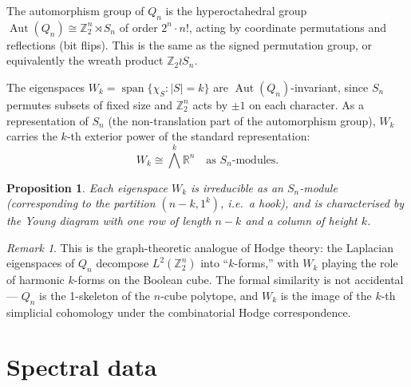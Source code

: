 \documentclass[11pt,a4paper]{article}
\theoremstyle{plain}
\newtheorem{proposition}[theorem]{Proposition}
\theoremstyle{definition}
\theoremstyle{remark}
\newtheorem{remark}[theorem]{Remark}
\newcommand{\Z}{\mathbb{Z}}
\newcommand{\R}{\mathbb{R}}
\newcommand{\Aut}{\operatorname{Aut}}
\begin{document}
The automorphism group of $Q_n$ is the hyperoctahedral group
$\Aut(Q_n) \cong \Z_2^n \rtimes S_n$ of order $2^n \cdot n!$, acting by
coordinate permutations and reflections (bit flips). This is the same as the
signed permutation group, or equivalently the wreath product $\Z_2 \wr S_n$.

The eigenspaces $W_k = \operatorname{span}\{\chi_S : |S| = k\}$ are
$\Aut(Q_n)$-invariant, since $S_n$ permutes subsets of fixed size and
$\Z_2^n$ acts by $\pm 1$ on each character. As a representation of $S_n$
(the non-translation part of the automorphism group), $W_k$ carries the
$k$-th exterior power of the standard representation:
\[
  W_k \cong \bigwedge^k \R^n \quad \text{as } S_n\text{-modules}.
\]

\begin{proposition}
Each eigenspace $W_k$ is irreducible as an $S_n$-module (corresponding to
the partition $(n-k, 1^k)$, i.e.\ a hook), and is characterised by the Young
diagram with one row of length $n-k$ and a column of height $k$.
\end{proposition}

\begin{remark}
This is the graph-theoretic analogue of Hodge theory: the Laplacian
eigenspaces of $Q_n$ decompose $L^2(\Z_2^n)$ into ``$k$-forms,'' with $W_k$
playing the role of harmonic $k$-forms on the Boolean cube. The formal
similarity is not accidental --- $Q_n$ is the 1-skeleton of the $n$-cube
polytope, and $W_k$ is the image of the $k$-th simplicial cohomology under
the combinatorial Hodge correspondence.
\end{remark}


\section{Spectral data}
\end{document}
